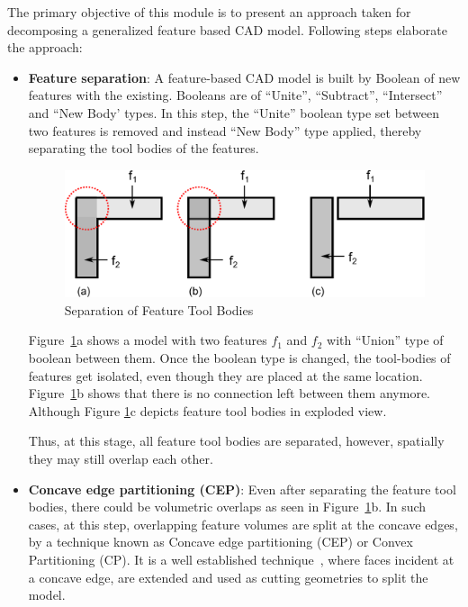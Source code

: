 The primary objective of this module is to present an approach taken for decomposing a generalized feature based CAD model. Following steps elaborate the approach:
\begin{itemize}[noitemsep,topsep=2pt,parsep=2pt,partopsep=2pt]
\item \textbf{Feature separation}: A feature-based CAD model is built by Boolean of new features with the existing. Booleans are of ``Unite'', ``Subtract'', ``Intersect'' and ``New Body' types.  In this step, the ``Unite'' boolean type set between two features is removed and instead ``New Body'' type applied, thereby separating the tool bodies of the features.



  \begin{figure}[!h]
\centering     %
\includegraphics[width=0.75\linewidth,valign=t]{../Common/images/newbody_bw.pdf}
\caption{Separation of Feature Tool Bodies}
\label{fig:litsurvey:newbody}
\end{figure}



Figure~\ref{fig:litsurvey:newbody}a shows a model with two features $f_1$ and $f_2$ with ``Union'' type of boolean between them. Once the boolean type is changed, the tool-bodies of features get isolated, even though they are placed at the same location. Figure~\ref{fig:litsurvey:newbody}b shows that there is no connection left between them anymore.  Although Figure \ref{fig:litsurvey:newbody}c  depicts feature tool bodies in exploded view.%

 Thus, at this stage, all feature tool bodies are separated, however, spatially they may still overlap each other.
\item \textbf{Concave edge partitioning (CEP)}:  Even after separating the feature tool bodies, there could be volumetric overlaps as seen in Figure~\ref{fig:litsurvey:newbody}b. In such cases, at this step, overlapping feature volumes are split at the concave edges, by a technique known as Concave edge partitioning (CEP) or Convex Partitioning (CP). It is a well established technique~\cite{Woo2002, Woo2003, Woo2003a, Woo2006, Woo2009}, where faces incident at a concave edge, are extended and used as cutting geometries to split the model.


\end{itemize}
